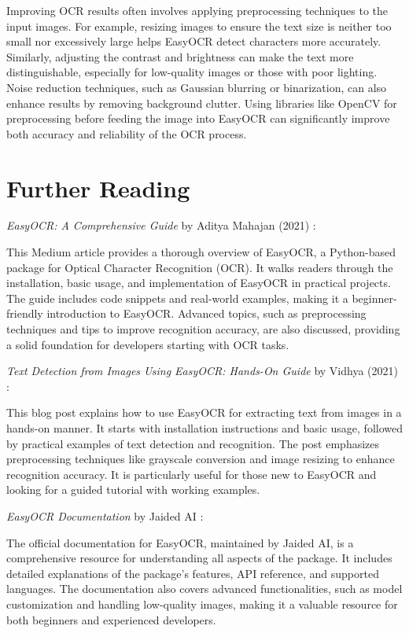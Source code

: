 Improving OCR results often involves applying preprocessing techniques to the input images. For example, resizing images to ensure the text size is neither too small nor excessively large helps EasyOCR detect characters more accurately. Similarly, adjusting the contrast and brightness can make the text more distinguishable, especially for low-quality images or those with poor lighting. Noise reduction techniques, such as Gaussian blurring or binarization, can also enhance results by removing background clutter. Using libraries like OpenCV for preprocessing before feeding the image into EasyOCR can significantly improve both accuracy and reliability of the OCR process.

\section{Further Reading}

\textit{EasyOCR: A Comprehensive Guide} by Aditya Mahajan (2021) \cite{Mahajan:2023}:

This Medium article provides a thorough overview of EasyOCR, a Python-based package for Optical Character Recognition (OCR). It walks readers through the installation, basic usage, and implementation of EasyOCR in practical projects. The guide includes code snippets and real-world examples, making it a beginner-friendly introduction to EasyOCR. Advanced topics, such as preprocessing techniques and tips to improve recognition accuracy, are also discussed, providing a solid foundation for developers starting with OCR tasks.

\textit{Text Detection from Images Using EasyOCR: Hands-On Guide} by Vidhya (2021) \cite{Augmentedstartupsanpr:2023}:

This blog post explains how to use EasyOCR for extracting text from images in a hands-on manner. It starts with installation instructions and basic usage, followed by practical examples of text detection and recognition. The post emphasizes preprocessing techniques like grayscale conversion and image resizing to enhance recognition accuracy. It is particularly useful for those new to EasyOCR and looking for a guided tutorial with working examples.

\textit{EasyOCR Documentation} by Jaided AI \cite{Jaidedeasyocr:2024}:

The official documentation for EasyOCR, maintained by Jaided AI, is a comprehensive resource for understanding all aspects of the package. It includes detailed explanations of the package's features, API reference, and supported languages. The documentation also covers advanced functionalities, such as model customization and handling low-quality images, making it a valuable resource for both beginners and experienced developers.


